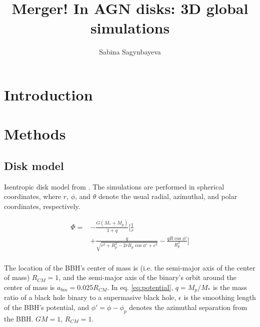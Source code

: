 \documentclass[twocolumn]{aastex631}
\begin{document}
\title{Merger! In AGN disks: 3D global simulations}

\author[0000-0002-6650-3829]{Sabina Sagynbayeva}


\begin{abstract}
   
\end{abstract}

\section{Introduction} 
\label{sec:intro}

\section{Methods}
\label{sec:methods}

\subsection{Disk model}
Isentropic disk model from \citet{Fung_2017}.
The simulations are performed in spherical coordinates, where $r$, $\phi$, and $\theta$ denote the usual radial, azimuthal, and polar coordinates, respectively. 

\begin{equation}\label{eq:potential}
\begin{aligned}
     \Phi = & -\frac{G(M_*+M_p)}{1+q} \bigg[\frac{1}{r} \\
     & + \frac{q}{\sqrt{r^2+R_p^2-2rR_p\cos{\phi'}+\epsilon^2}} - \frac{qR\cos{\phi'}}{R_p^2}\bigg] \\
\end{aligned}
\end{equation}

The location of the BBH's center of mass is (i.e. the semi-major axis of the center of mass) $R_{CM} = 1$, and the semi-major axis of the binary's orbit around the center of mass is $a_{bin} = 0.025 R_{CM}$.
In eq. \ref{eq:potential}, $q = M_p/M_*$ is the mass ratio of a black hole binary to a supermasive black hole, $\epsilon$ is the smoothing length of the BBH's potential, and $\phi'= \phi-\phi_p$ denotes the azimuthal separation from the BBH. $GM=1$, $R_{CM}=1$.
\end{document}
